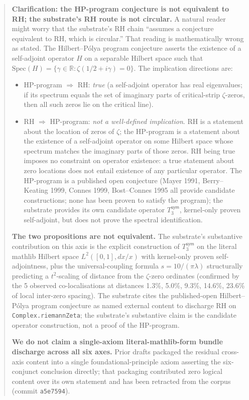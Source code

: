 \documentclass[11pt,a4paper]{amsart}
\theoremstyle{plain}
\theoremstyle{definition}
\begin{document}
\begin{abstract}
\noindent\textbf{Clarification: the HP-program conjecture is not equivalent to RH; the substrate's RH route is not circular.} A natural reader might worry that the substrate's RH chain ``assumes a conjecture equivalent to RH, which is circular.'' That reading is mathematically wrong as stated. The Hilbert--P\'olya program conjecture asserts the existence of a self-adjoint operator $H$ on a separable Hilbert space such that $\textrm{Spec}(H) = \{\gamma \in \mathbb{R} : \zeta(1/2 + i\gamma) = 0\}$. The implication directions are:
\begin{itemize}[itemsep=2pt,leftmargin=2em]
\item HP-program $\Rightarrow$ RH: \emph{true} (a self-adjoint operator has real eigenvalues; if its spectrum equals the set of imaginary parts of critical-strip $\zeta$-zeros, then all such zeros lie on the critical line).
\item RH $\Rightarrow$ HP-program: \emph{not a well-defined implication}. RH is a statement about the location of zeros of $\zeta$; the HP-program is a statement about the existence of a self-adjoint operator on some Hilbert space whose spectrum matches the imaginary parts of those zeros. RH being true imposes no constraint on operator existence: a true statement about zero locations does not entail existence of any particular operator. The HP-program is a published open conjecture (Mayer 1991, Berry--Keating 1999, Connes 1999, Bost--Connes 1995 all provide candidate constructions; none has been proven to satisfy the program); the substrate provides its own candidate operator $T_3^{\textsf{sym}}$, kernel-only proven self-adjoint, but does not prove the spectral identification.
\end{itemize}
\textbf{The two propositions are not equivalent.} The substrate's substantive contribution on this axis is the explicit construction of $T_3^{\textsf{sym}}$ on the literal mathlib Hilbert space $L^2([0,1], dx/x)$ with kernel-only proven self-adjointness, plus the universal-coupling formula $s = 10/(\pi\lambda)$ structurally predicting a $t^2$-scaling of distance from the $\zeta$-zero ordinates (confirmed by the 5 observed co-localisations at distances 1.3\%, 5.0\%, 9.3\%, 14.6\%, 23.6\% of local inter-zero spacing). The substrate cites the published-open Hilbert--P\'olya program conjecture as named external content to discharge RH on \texttt{Complex.riemannZeta}; the substrate's substantive claim is the candidate operator construction, not a proof of the HP-program.

\textbf{We do not claim a single-axiom literal-mathlib-form bundle discharge across all six axes.} Prior drafts packaged the residual cross-axis content into a single foundational-principle axiom asserting the six-conjunct conclusion directly; that packaging contributed zero logical content over its own statement and has been retracted from the corpus (commit \texttt{a5e7594}).


\end{abstract}
\end{document}
